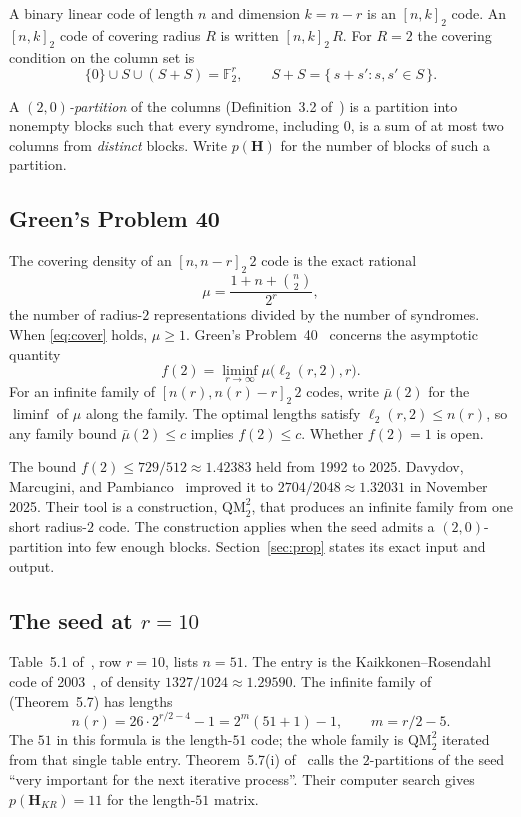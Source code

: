 \documentclass[11pt,a4paper]{article}
\newcommand{\FF}{\mathbb{F}}
\newcommand{\HH}{\boldsymbol{H}}
\newcommand{\ellr}{\ell_2}
\begin{document}
A binary linear code of length $n$ and dimension $k=n-r$ is an
$[n,k]_2$ code. An $[n,k]_2$ code of covering radius $R$ is written
$[n,k]_2\,R$. For $R=2$ the covering condition on the column set is
\begin{equation}
\label{eq:cover}
\{0\}\cup S\cup(S+S)=\FF_2^r,
\qquad S+S=\{\,s+s' : s,s'\in S\,\}.
\end{equation}

A \emph{$(2,0)$-partition} of the columns (Definition~3.2
of~\cite{DMP2025}) is a partition into nonempty blocks such that every
syndrome, including $0$, is a sum of at most two columns from
\emph{distinct} blocks. Write $p(\HH)$ for the number of blocks of such
a partition.

\subsection{Green's Problem 40}

The covering density of an $[n,n-r]_2\,2$ code is the exact rational
\[
\mu=\frac{1+n+\binom{n}{2}}{2^r},
\]
the number of radius-$2$ representations divided by the number of
syndromes. When \eqref{eq:cover} holds, $\mu\ge 1$. Green's
Problem~40~\cite{Green} concerns the asymptotic quantity
\[
f(2)=\liminf_{r\to\infty}\mu\bigl(\ellr(r,2),r\bigr).
\]
For an infinite family of $[n(r),n(r)-r]_2\,2$ codes, write
$\bar\mu(2)$ for the $\liminf$ of $\mu$ along the family. The optimal
lengths satisfy $\ellr(r,2)\le n(r)$, so any family bound
$\bar\mu(2)\le c$ implies $f(2)\le c$. Whether $f(2)=1$ is open.

The bound $f(2)\le 729/512\approx 1.42383$ held from 1992 to 2025.
Davydov, Marcugini, and Pambianco~\cite{DMP2025} improved it to
$2704/2048\approx 1.32031$ in November 2025. Their tool is a
construction, $\mathrm{QM}_2^2$, that produces an infinite family from
one short radius-$2$ code. The construction applies when the seed
admits a $(2,0)$-partition into few enough blocks.
Section~\ref{sec:prop} states its exact input and output.

\subsection{The seed at $r=10$}

Table~5.1 of~\cite{DMP2025}, row $r=10$, lists $n=51$. The entry is the
Kaikkonen--Rosendahl code of 2003~\cite{KR2003}, of density
$1327/1024\approx 1.29590$. The infinite family of~\cite{DMP2025}
(Theorem~5.7) has lengths
\[
n(r)=26\cdot 2^{r/2-4}-1=2^{m}(51+1)-1,\qquad m=r/2-5 .
\]
The $51$ in this formula is the length-$51$ code; the whole family is
$\mathrm{QM}_2^2$ iterated from that single table entry.
Theorem~5.7(i) of~\cite{DMP2025} calls the $2$-partitions of the seed
``very important for the next iterative process''. Their computer
search gives $p(\HH_{KR})=11$ for the length-$51$ matrix.
\end{document}
